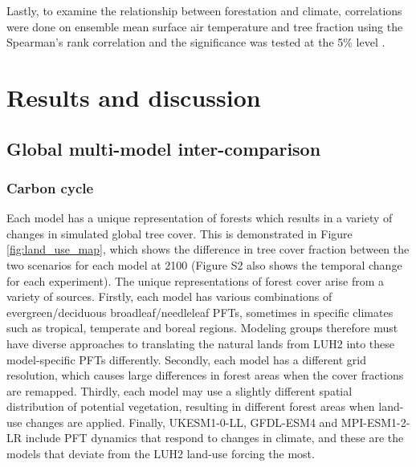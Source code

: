 \documentclass[draft]{agujournal2019}
\begin{document}
Lastly, to examine the relationship between forestation and climate, correlations were done on ensemble mean surface air temperature and tree fraction using the Spearman's rank correlation and the significance was tested at the 5\% level \cite{kokoska2000crc}.

\section{Results and discussion}

\subsection{Global multi-model inter-comparison}

\subsubsection{Carbon cycle}

Each model has a unique representation of forests which results in a variety of changes in simulated global tree cover.
This is demonstrated in Figure \ref{fig:land_use_map}, which shows the difference in tree cover fraction between the two scenarios for each model at 2100 (Figure S2 also shows the temporal change for each experiment).
The unique representations of forest cover arise from a variety of sources.
Firstly, each model has various combinations of evergreen/deciduous broadleaf/needleleaf PFTs, sometimes in specific climates such as tropical, temperate and boreal regions.
Modeling groups therefore must have diverse approaches to translating the natural lands from LUH2 into these model-specific PFTs differently.
Secondly, each model has a different grid resolution, which causes large differences in forest areas when the cover fractions are remapped.
Thirdly, each model may use a slightly different spatial distribution of potential vegetation, resulting in different forest areas when land-use changes are applied.
Finally, UKESM1-0-LL, GFDL-ESM4 and MPI-ESM1-2-LR include PFT dynamics that respond to changes in climate, and these are the models that deviate from the LUH2 land-use forcing the most.
\end{document}
